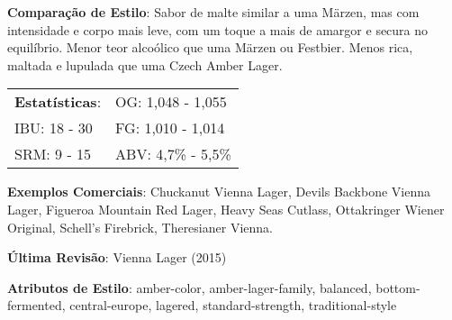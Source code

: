 \textbf{Comparação de Estilo}: Sabor de malte similar a uma Märzen, mas com intensidade e corpo mais leve, com um toque a mais de amargor e secura no equilíbrio. Menor teor alcoólico que uma Märzen ou Festbier. Menos rica, maltada e lupulada que uma Czech Amber Lager.

\begin{tabular}{@{}p{35mm}p{35mm}@{}}
  \textbf{Estatísticas}: & OG: 1,048 - 1,055 \\
  IBU: 18 - 30 & FG: 1,010 - 1,014 \\
  SRM: 9 - 15 & ABV: 4,7\% - 5,5\%
\end{tabular}

\textbf{Exemplos Comerciais}: Chuckanut Vienna Lager, Devils Backbone Vienna Lager, Figueroa Mountain Red Lager, Heavy Seas Cutlass, Ottakringer Wiener Original, Schell’s Firebrick, Theresianer Vienna.

\textbf{Última Revisão}: Vienna Lager (2015)

\textbf{Atributos de Estilo}: amber-color, amber-lager-family, balanced, bottom-fermented, central-europe, lagered, standard-strength, traditional-style
